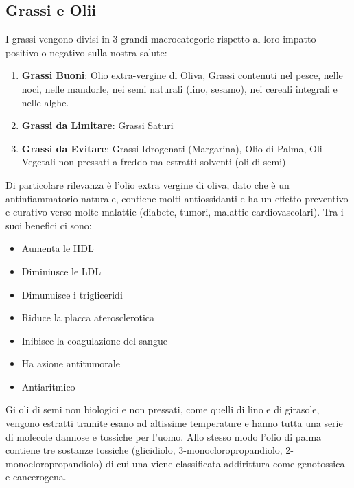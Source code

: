 \documentclass[../uefaC.tex]{subfiles}
\begin{document}
\subsection{Grassi e Olii}
I grassi vengono divisi in 3 grandi macrocategorie rispetto al loro impatto positivo o negativo sulla nostra salute:
\begin{enumerate}
    \item \textbf{Grassi Buoni}: Olio extra-vergine di Oliva, Grassi contenuti nel pesce, nelle noci, nelle mandorle, nei semi naturali (lino, sesamo), nei cereali integrali e nelle alghe.
    \item \textbf{Grassi da Limitare}: Grassi Saturi
    \item \textbf{Grassi da Evitare}: Grassi Idrogenati (Margarina), Olio di Palma, Oli Vegetali non pressati a freddo ma estratti solventi (oli di semi)
\end{enumerate}
Di particolare rilevanza è l'olio extra vergine di oliva, dato che è un antinfiammatorio naturale, contiene molti antiossidanti e ha un effetto preventivo e curativo verso molte malattie (diabete, tumori, malattie cardiovascolari). Tra i suoi benefici ci sono:
\begin{itemize}
    \item Aumenta le HDL
    \item Diminiusce le LDL
    \item Dimunuisce i trigliceridi
    \item Riduce la placca aterosclerotica
    \item Inibisce la coagulazione del sangue
    \item Ha azione antitumorale
    \item Antiaritmico
\end{itemize}
Gi oli di semi non biologici e non pressati, come quelli di lino e di girasole, vengono estratti tramite esano ad altissime temperature e hanno tutta una serie di molecole dannose e tossiche per l'uomo. Allo stesso modo l'olio di palma contiene tre sostanze tossiche (glicidiolo, 3-monocloropropandiolo, 2-monocloropropandiolo) di cui una viene classificata addirittura come genotossica e cancerogena.
\end{document}
